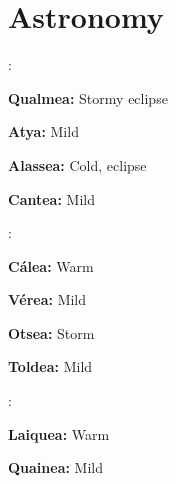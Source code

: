 \label{lastpage}
\renewcommand{\headingtype}{APPENDIX}

\chapter{Astronomy}\label{astronomy}\label{seasons}
\setcounter{list}{0}\setcounter{enc}{0}

\begin{multicols}{2}

\begin{tcolorbox}
\begin{list}{\addtocounter{enc}{1} \bf Cycle }{}

\item :

\begin{list}{\addtocounter{list}{1}}{}

\item \textbf{Qualmea:}  Stormy eclipse

\item \textbf{Atya:}  Mild

\item \textbf{Alassea:}  Cold, eclipse

\item \textbf{Cantea:}  Mild
\end{list}

\item :

\begin{list}{\addtocounter{list}{1}}{}
\item \textbf{C\'{a}lea:}  Warm

\item \textbf{V\'{e}rea:}  Mild

\item \textbf{Otsea:}  Storm

\item \textbf{Toldea:}  Mild

\end{list}

\item :

\begin{list}{\addtocounter{list}{1}}{}

\item \textbf{Laiquea:}  Warm

\item \textbf{Quainea:}  Mild


\end{list}
\end{list}
\end{tcolorbox}
\end{multicols}
